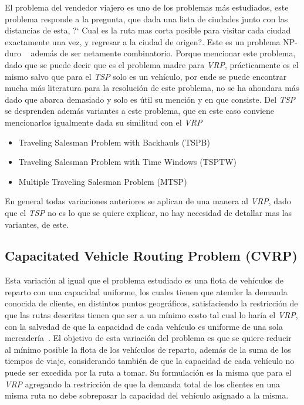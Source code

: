 \documentclass[letter, 10pt]{article}
\begin{document}
El problema del vendedor viajero es uno de los problemas m\'as estudiados, 
este problema responde a la pregunta, que dada una lista de ciudades 
junto con las distancias de esta, ?` Cual es la ruta mas corta posible 
para visitar cada ciudad exactamente una vez, y regresar a la ciudad de origen?. 
Este es un problema NP-duro ~\cite{TSP} adem\'as de ser netamente combinatorio. 
Porque mencionar este problema, dado que se puede decir que
es el problema madre para \emph{VRP}, pr\'acticamente es el mismo salvo que para el 
\emph{TSP} solo es un veh\'iculo, por ende se puede encontrar mucha m\'as literatura para 
la resoluci\'on de este problema, no se ha ahondara m\'as dado que abarca demasiado y solo 
es \'util su menci\'on y en que consiste.
\newline
Del \emph{TSP} se desprenden adem\'as variantes a este problema, que en este caso conviene 
mencionarlos igualmente dada su similitud con el \emph{VRP} ~\cite{TSP}

\begin{itemize}
 \item Traveling Salesman Problem with Backhauls (TSPB)
 \item Traveling Salesman Problem with Time Windows (TSPTW)
 \item Multiple Traveling Salesman Problem (MTSP)
\end{itemize}

En general todas variaciones anteriores se aplican de una manera al \emph{VRP}, dado que el \emph{TSP} no es lo que se quiere explicar, no hay necesidad de
detallar mas las variantes, de este.

\subsection{Capacitated Vehicle Routing Problem (CVRP)}
Esta variaci\'on al igual que el problema estudiado es una flota de veh\'iculos de reparto con una capacidad uniforme, los cuales 
tienen que atender la demanda conocida de cliente, en distintos puntos geogr\'aficos, satisfaciendo la restricci\'on de que las rutas descritas tienen
que ser a un m\'inimo costo tal cual lo har\'ia el \emph{VRP}, con la salvedad de que la capacidad de cada veh\'iculo es 
uniforme de una sola mercader\'ia~\cite{CVRP}.
\newline
El objetivo de esta variaci\'on del problema es que se quiere reducir al m\'inimo posible la flota de los veh\'iculos de reparto, adem\'as 
de la suma de los tiempos de viaje, considerando tambi\'en de que la capacidad de cada veh\'iculo no puede ser excedida por la ruta a tomar.
Su formulaci\'on es la misma que para el \emph{VRP} agregando la restricci\'on de que la demanda total de los clientes en una misma ruta
no debe sobrepasar la capacidad del veh\'iculo asignado a la misma.
\end{document}
